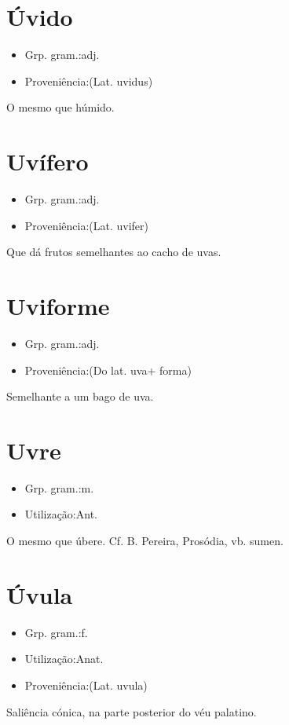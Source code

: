 \documentclass{article}
\begin{document}
\section{Úvido}
\begin{itemize}
\item {Grp. gram.:adj.}
\end{itemize}
\begin{itemize}
\item {Proveniência:(Lat. \textunderscore uvidus\textunderscore )}
\end{itemize}
O mesmo que \textunderscore húmido\textunderscore .
\section{Uvífero}
\begin{itemize}
\item {Grp. gram.:adj.}
\end{itemize}
\begin{itemize}
\item {Proveniência:(Lat. \textunderscore uvifer\textunderscore )}
\end{itemize}
Que dá frutos semelhantes ao cacho de uvas.
\section{Uviforme}
\begin{itemize}
\item {Grp. gram.:adj.}
\end{itemize}
\begin{itemize}
\item {Proveniência:(Do lat. \textunderscore uva\textunderscore  + \textunderscore forma\textunderscore )}
\end{itemize}
Semelhante a um bago de uva.
\section{Uvre}
\begin{itemize}
\item {Grp. gram.:m.}
\end{itemize}
\begin{itemize}
\item {Utilização:Ant.}
\end{itemize}
O mesmo que \textunderscore úbere\textunderscore . Cf. B. Pereira, \textunderscore Prosódia\textunderscore , vb. \textunderscore sumen\textunderscore .
\section{Úvula}
\begin{itemize}
\item {Grp. gram.:f.}
\end{itemize}
\begin{itemize}
\item {Utilização:Anat.}
\end{itemize}
\begin{itemize}
\item {Proveniência:(Lat. \textunderscore uvula\textunderscore )}
\end{itemize}
Saliência cónica, na parte posterior do véu palatino.
\end{document}
